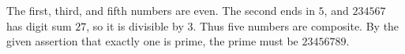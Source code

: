 The first, third, and fifth numbers are even. The second ends in $5$, and $234567$ has digit sum $27$, so it is divisible by $3$. Thus five numbers are composite. By the given assertion that exactly one is prime, the prime must be $\boxed{23456789}$.

